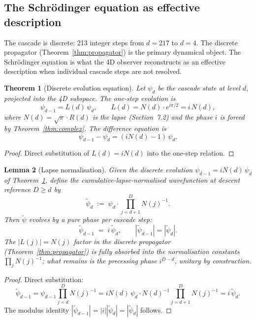 \documentclass[12pt,a4paper]{article}
\newtheorem{theorem}{Theorem}[section]
\newtheorem{lemma}[theorem]{Lemma}
\begin{document}
\subsection{The Schr\"{o}dinger equation as effective description}

The cascade is discrete: 213 integer steps from $d=217$ to $d=4$. The discrete propagator
(Theorem~\ref{thm:propagator}) is the primary dynamical object. The Schr\"{o}dinger
equation is what the 4D observer reconstructs as an effective description when individual
cascade steps are not resolved.

\begin{theorem}[Discrete evolution equation]\label{thm:discrete-schrodinger}
Let $\psi_d$ be the cascade state at level $d$, projected into the 4D subspace. The
one-step evolution is
\[
\psi_{d-1} = L(d)\,\psi_d, \qquad L(d) = N(d)\cdot e^{i\pi/2} = i\,N(d),
\]
where $N(d) = \sqrt{\pi}\cdot R(d)$ is the lapse (Section~7.2) and the phase $i$ is forced
by Theorem~\ref{thm:complex}. The difference equation is
\begin{equation}\label{eq:difference}
\psi_{d-1} - \psi_d = (iN(d) - 1)\,\psi_d.
\end{equation}
\end{theorem}
\begin{proof}
Direct substitution of $L(d) = iN(d)$ into the one-step relation.
\end{proof}

\begin{lemma}[Lapse normalisation]\label{lem:lapse-norm}
Given the discrete evolution $\psi_{d-1} = iN(d)\,\psi_d$ of
Theorem~\ref{thm:discrete-schrodinger}, define the cumulative-lapse-normalised
wavefunction at descent reference $D \geq d$ by
\[
\tilde\psi_d \;:=\; \psi_d \cdot \prod_{j=d+1}^{D} N(j)^{-1}.
\]
Then $\tilde\psi$ evolves by a pure phase per cascade step:
\[
\tilde\psi_{d-1} \;=\; i\,\tilde\psi_d,
\qquad
|\tilde\psi_{d-1}| = |\tilde\psi_d|.
\]
The $|L(j)| = N(j)$ factor in the discrete propagator
(Theorem~\ref{thm:propagator}) is fully absorbed into the normalisation
constants $\prod_j N(j)^{-1}$; what remains is the precessing phase
$i^{D-d}$, unitary by construction.
\end{lemma}
\begin{proof}
Direct substitution:
\[
\tilde\psi_{d-1}
= \psi_{d-1} \prod_{j=d}^{D} N(j)^{-1}
= iN(d)\,\psi_d \cdot N(d)^{-1} \prod_{j=d+1}^{D} N(j)^{-1}
= i\,\tilde\psi_d.
\]
The modulus identity $|\tilde\psi_{d-1}| = |i||\tilde\psi_d| = |\tilde\psi_d|$
follows.
\end{proof}
\end{document}
